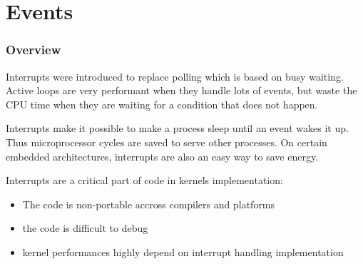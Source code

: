 \section{Events}

%
%
%

\begin{frame}
  \frametitle{Overview}

  Interrupts were introduced to replace polling which is based on busy waiting.
  Active loops are very performant when they handle lots of events, but
  waste the CPU time when they are waiting for a condition that does not
  happen.

  \-

  Interrupts make it possible to make a process sleep until an event wakes it
  up. Thus microprocessor cycles are saved to serve other processes. On certain
  embedded architectures, interrupts are also an easy way to save energy.

  \-

  Interrupts are a critical part of code in kernels implementation:

  \begin{itemize}
    \item The code is non-portable accross compilers and platforms
    \item the code is difficult to debug
    \item kernel performances highly depend on interrupt handling implementation
  \end{itemize}

\end{frame}


%
%
%

